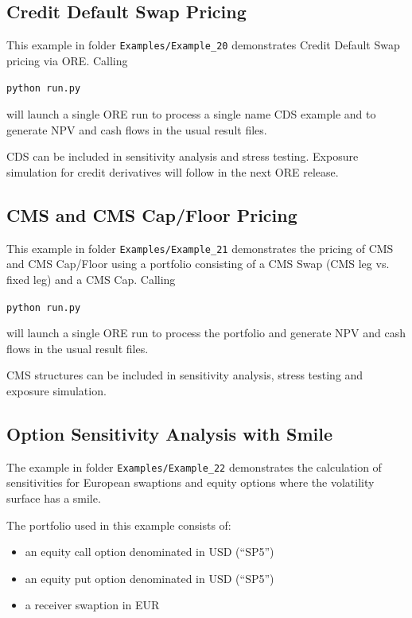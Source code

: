 \documentclass[12pt, a4paper]{article}
\begin{document}
\subsection{Credit Default Swap Pricing}%

This example in folder {\tt Examples/Example\_20} demonstrates Credit Default Swap pricing via ORE. Calling

\medskip
\centerline{\tt python run.py}

\medskip
will launch a single ORE run to process a single name CDS example and to generate NPV and cash flows in the usual result files. 

\medskip
CDS can be included in sensitivity analysis and stress testing. Exposure simulation for credit derivatives will follow in the next ORE release.

\subsection{CMS and CMS Cap/Floor Pricing}%

This example in folder {\tt Examples/Example\_21} demonstrates the pricing of CMS and CMS Cap/Floor using a portfolio consisting of a CMS Swap (CMS leg vs. fixed leg) and a CMS Cap. Calling

\medskip
\centerline{\tt python run.py}

\medskip
will launch a single ORE run to process the portfolio and generate NPV and cash flows in the usual result files. 

\medskip
CMS structures can be included in sensitivity analysis, stress testing and exposure simulation. 

\subsection{Option Sensitivity Analysis with Smile}%

The example in folder {\tt Examples/Example\_22} demonstrates the calculation of sensitivities for European swaptions and equity options where the volatility surface has a smile. 

\medskip
The portfolio used in this example consists of:
\begin{itemize}
	\item an equity call option denominated in USD (``SP5'')
	\item an equity put option denominated in USD (``SP5'')
	\item a receiver swaption in EUR
\end{itemize}
\end{document}
